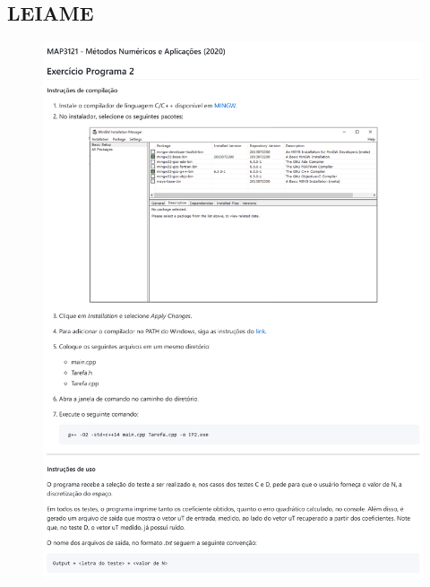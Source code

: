 \documentclass[12pt]{article}
\begin{document}
\begin{spacing}{1.5}
\subsection{LEIAME}
\begin{figure}[H]
    \centering
    \includegraphics[width=0.9\linewidth]{README.png}
\end{figure}
\renewcommand{\footnotesize}{\tiny}

\end{spacing}
\end{document}
